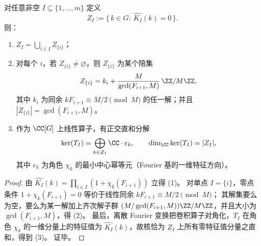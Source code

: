 \begin{proposition}\label{prop:fold-fiber-convolution-kernel-zero-spectrum}
对任意非空 \(I\subseteq\{1,\dots,m\}\) 定义
\[
Z_I:=\{\,k\in G:\ \widehat{K_I}(k)=0\,\}.
\]
则：
\begin{enumerate}
\normalfont
  \item \(Z_I=\bigcup_{i\in I}Z_{\{i\}}\)；
  \item 对每个 \(i\)，若 \(Z_{\{i\}}\neq\varnothing\)，则 \(Z_{\{i\}}\) 为某个陪集
  \[
  Z_{\{i\}}=k_i+\frac{M}{\gcd(F_{i+1},M)}\,\ZZ/M\ZZ,
  \]
  其中 \(k_i\) 为同余 \(kF_{i+1}\equiv M/2\pmod M\) 的任一解；并且 \(|Z_{\{i\}}|=\gcd(F_{i+1},M)\)。
  \item 作为 \(\CC[G]\) 上线性算子，有正交直和分解
\[
\ker(T_I)=\bigoplus_{k\in Z_I}\CC\cdot e_k,
\qquad
\dim_{\CC}\ker(T_I)=|Z_I|,
\]
其中 \(e_k\) 为角色 \(\chi_k\) 的最小中心幂等元（Fourier 基的一维特征方向）。
\end{enumerate}
\end{proposition}
\begin{proof}
由 \(\widehat{K_I}(k)=\prod_{i\in I}(1+\chi_k(F_{i+1}))\) 立得 (1)。
对单点 \(I=\{i\}\)，零点条件 \(1+\chi_k(F_{i+1})=0\) 等价于线性同余 \(kF_{i+1}\equiv M/2\pmod M\)；
其解集要么为空，要么为某一解加上齐次解子群 \((M/\gcd(F_{i+1},M))\ZZ/M\ZZ\)，并且大小为 \(\gcd(F_{i+1},M)\)，得 (2)。
最后，离散 Fourier 变换把卷积算子对角化，\(T_I\) 在角色 \(\chi_k\) 的一维分量上的特征值为 \(\widehat{K_I}(k)\)，故核恰为 \(Z_I\) 上所有零特征值分量之直和，得到 (3)。
证毕。
\end{proof}

